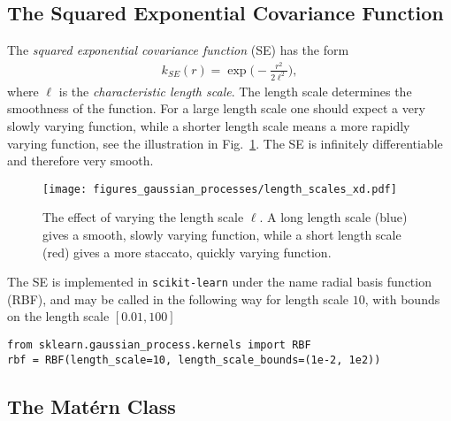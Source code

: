 \documentclass[twoside,english]{uiofysmaster}
\begin{document}
\subsection{The Squared Exponential Covariance Function}

The \textit{squared exponential covariance function} (SE) has the form 
\begin{align}
k_{SE} (r) = \exp \Big( - \frac{r^2}{2 \ell^2} \Big),
\end{align} 
where $\ell$ is the \textit{characteristic length scale}. The length scale determines the smoothness of the function. For a large length scale one should expect a very slowly varying function, while a shorter length scale means a more rapidly varying function, see the illustration in Fig.~\ref{Fig:: gaussian process : ell variation example}. The SE is infinitely differentiable and therefore very smooth. 

\begin{figure}
\centering
\texttt{[image: figures\_gaussian\_processes/length\_scales\_xd.pdf]}
\caption{The effect of varying the length scale $\ell$. A long length scale (blue) gives a smooth, slowly varying function, while a short length scale (red) gives a more staccato, quickly varying function.}
\label{Fig:: gaussian process : ell variation example}
\end{figure}

The SE is implemented in \verb|scikit-learn| under the name radial basis function (RBF), and may be called in the following way for length scale $10$, with bounds on the length scale $[0.01, 100]$
\begin{lstlisting}
from sklearn.gaussian_process.kernels import RBF
rbf = RBF(length_scale=10, length_scale_bounds=(1e-2, 1e2))
\end{lstlisting}



\subsection{The Mat\'{e}rn Class }
\end{document}
